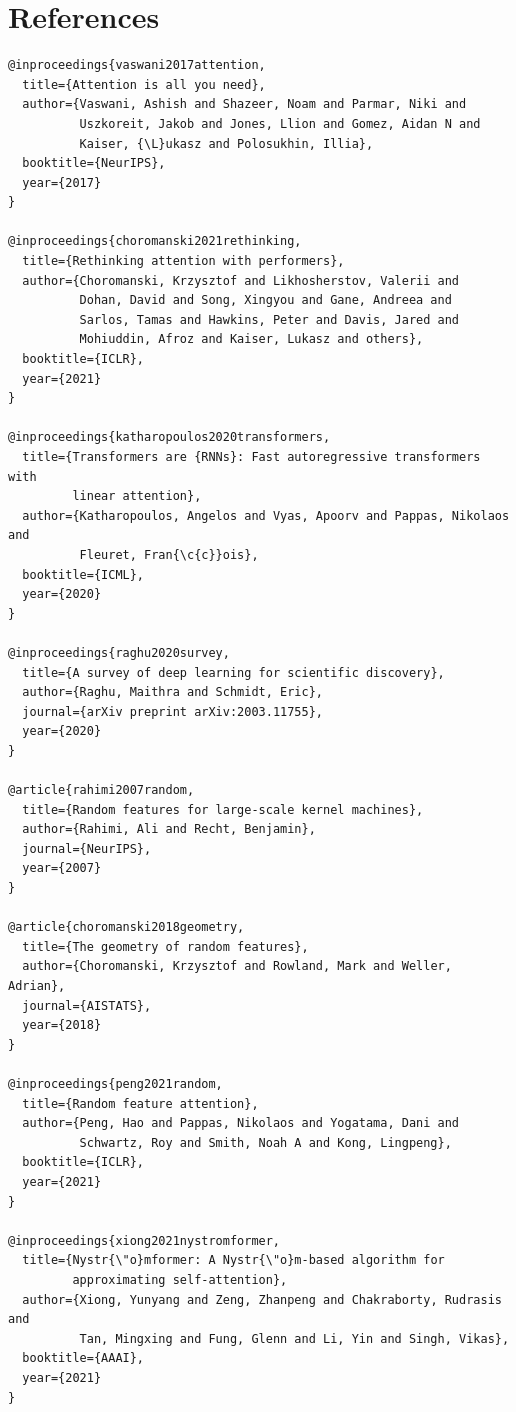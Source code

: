 
\section{References}

\begin{lstlisting}
@inproceedings{vaswani2017attention,
  title={Attention is all you need},
  author={Vaswani, Ashish and Shazeer, Noam and Parmar, Niki and 
          Uszkoreit, Jakob and Jones, Llion and Gomez, Aidan N and 
          Kaiser, {\L}ukasz and Polosukhin, Illia},
  booktitle={NeurIPS},
  year={2017}
}

@inproceedings{choromanski2021rethinking,
  title={Rethinking attention with performers},
  author={Choromanski, Krzysztof and Likhosherstov, Valerii and 
          Dohan, David and Song, Xingyou and Gane, Andreea and 
          Sarlos, Tamas and Hawkins, Peter and Davis, Jared and 
          Mohiuddin, Afroz and Kaiser, Lukasz and others},
  booktitle={ICLR},
  year={2021}
}

@inproceedings{katharopoulos2020transformers,
  title={Transformers are {RNNs}: Fast autoregressive transformers with 
         linear attention},
  author={Katharopoulos, Angelos and Vyas, Apoorv and Pappas, Nikolaos and 
          Fleuret, Fran{\c{c}}ois},
  booktitle={ICML},
  year={2020}
}

@inproceedings{raghu2020survey,
  title={A survey of deep learning for scientific discovery},
  author={Raghu, Maithra and Schmidt, Eric},
  journal={arXiv preprint arXiv:2003.11755},
  year={2020}
}

@article{rahimi2007random,
  title={Random features for large-scale kernel machines},
  author={Rahimi, Ali and Recht, Benjamin},
  journal={NeurIPS},
  year={2007}
}

@article{choromanski2018geometry,
  title={The geometry of random features},
  author={Choromanski, Krzysztof and Rowland, Mark and Weller, Adrian},
  journal={AISTATS},
  year={2018}
}

@inproceedings{peng2021random,
  title={Random feature attention},
  author={Peng, Hao and Pappas, Nikolaos and Yogatama, Dani and 
          Schwartz, Roy and Smith, Noah A and Kong, Lingpeng},
  booktitle={ICLR},
  year={2021}
}

@inproceedings{xiong2021nystromformer,
  title={Nystr{\"o}mformer: A Nystr{\"o}m-based algorithm for 
         approximating self-attention},
  author={Xiong, Yunyang and Zeng, Zhanpeng and Chakraborty, Rudrasis and 
          Tan, Mingxing and Fung, Glenn and Li, Yin and Singh, Vikas},
  booktitle={AAAI},
  year={2021}
}


\end{lstlisting}
